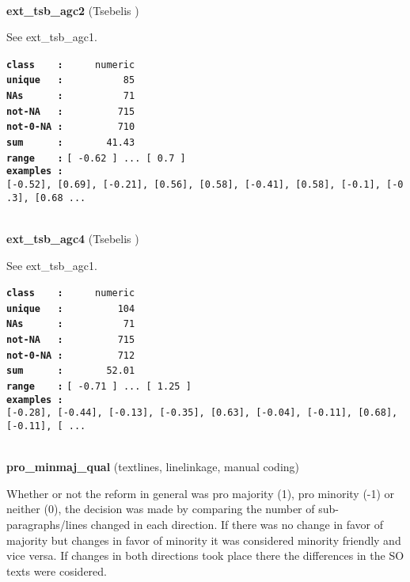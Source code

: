 \documentclass[]{article}
\begin{document}
~

\textbf{ext\_tsb\_agc2} (Tsebelis )

See ext\_tsb\_agc1.

\textbf{\texttt{class\ \ \ \ :}} \texttt{~~~~~numeric}\\
\textbf{\texttt{unique\ \ \ :}} \texttt{~~~~~~~~~~85}\\
\textbf{\texttt{NAs\ \ \ \ \ \ :}} \texttt{~~~~~~~~~~71}\\
\textbf{\texttt{not-NA\ \ \ :}} \texttt{~~~~~~~~~715}\\
\textbf{\texttt{not-0-NA\ :}} \texttt{~~~~~~~~~710}\\
\textbf{\texttt{sum\ \ \ \ \ \ :}} \texttt{~~~~~~~41.43}\\
\textbf{\texttt{range\ \ \ \ :}}
\texttt{{[}\ -0.62\ {]}\ ...\ {[}\ 0.7\ {]}}\\
\textbf{\texttt{examples\ :}}
\texttt{{[}-0.52{]},\ {[}0.69{]},\ {[}-0.21{]},\ {[}0.56{]},\ {[}0.58{]},\ {[}-0.41{]},\ {[}0.58{]},\ {[}-0.1{]},\ {[}-0.3{]},\ {[}0.68\ ...}\\

~

\textbf{ext\_tsb\_agc4} (Tsebelis )

See ext\_tsb\_agc1.

\textbf{\texttt{class\ \ \ \ :}} \texttt{~~~~~numeric}\\
\textbf{\texttt{unique\ \ \ :}} \texttt{~~~~~~~~~104}\\
\textbf{\texttt{NAs\ \ \ \ \ \ :}} \texttt{~~~~~~~~~~71}\\
\textbf{\texttt{not-NA\ \ \ :}} \texttt{~~~~~~~~~715}\\
\textbf{\texttt{not-0-NA\ :}} \texttt{~~~~~~~~~712}\\
\textbf{\texttt{sum\ \ \ \ \ \ :}} \texttt{~~~~~~~52.01}\\
\textbf{\texttt{range\ \ \ \ :}}
\texttt{{[}\ -0.71\ {]}\ ...\ {[}\ 1.25\ {]}}\\
\textbf{\texttt{examples\ :}}
\texttt{{[}-0.28{]},\ {[}-0.44{]},\ {[}-0.13{]},\ {[}-0.35{]},\ {[}0.63{]},\ {[}-0.04{]},\ {[}-0.11{]},\ {[}0.68{]},\ {[}-0.11{]},\ {[}\ ...}\\

~

\textbf{pro\_minmaj\_qual} (textlines, linelinkage, manual coding)

Whether or not the reform in general was pro majority (1), pro minority
(-1) or neither (0), the decision was made by comparing the number of
sub-paragraphs/lines changed in each direction. If there was no change
in favor of majority but changes in favor of minority it was considered
minority friendly and vice versa. If changes in both directions took
place there the differences in the SO texts were cosidered.
\end{document}
